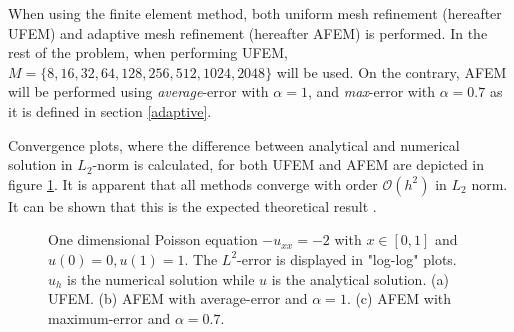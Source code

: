 When using the finite element method, both uniform mesh refinement (hereafter UFEM) and adaptive mesh refinement (hereafter AFEM) is performed. In the rest of the problem, when performing UFEM, $M = \{8,16,32,64,128,256,512,1024,2048\}$ will be used. On the contrary, AFEM will be performed using \textit{average}-error with $\alpha = 1$, and \textit{max}-error with $\alpha = 0.7$ as it is defined in section \ref{adaptive}.

Convergence plots, where the difference between analytical and numerical solution in $L_2$-norm is calculated, for both UFEM and AFEM are depicted in figure \ref{fig:5b}. It is apparent that all methods converge with order $\mathcal{O}(h^2)$ in $L_2$ norm. It can be shown that this is the expected theoretical result \cite{Curry}.

\begin{figure}[!t]
  \centering
  \hfill
  \hfill
  \caption{One dimensional Poisson equation $-u_{xx} = -2$ with $x \in [0,1]$ and $u(0) = 0, u(1) = 1$. The $L^2$-error is displayed in "log-log" plots. $u_h$ is the numerical solution while $u$ is the analytical solution. (a) UFEM. (b) AFEM with average-error and $\alpha = 1$. (c) AFEM with maximum-error and $\alpha = 0.7$.}
  \label{fig:5b}
\end{figure}


